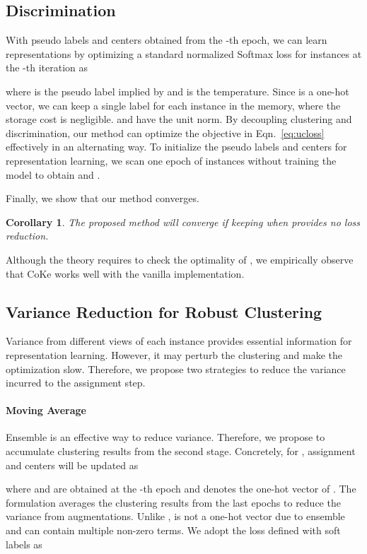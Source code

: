 \documentclass[10pt,twocolumn,letterpaper]{article}
\newtheorem{cor}{Corollary}
\begin{document}
\subsection{Discrimination}
With pseudo labels and centers obtained from the -th epoch, we can learn representations by optimizing a standard normalized Softmax loss for instances at the -th iteration as

where  is the pseudo label implied by  and  is the temperature. Since  is a one-hot vector, we can keep a single label for each instance in the memory, where the storage cost is negligible.  and  have the unit norm. By decoupling clustering and discrimination, our method can optimize the objective in Eqn.~\ref{eq:ucloss} effectively in an alternating way. To initialize the pseudo labels and centers for representation learning, we scan one epoch of instances without training the model to obtain  and .

Finally, we show that our method converges. 
\begin{cor}
The proposed method will converge if keeping  when  provides no loss reduction.
\end{cor}
Although the theory requires to check the optimality of , we empirically observe that CoKe works well with the vanilla implementation.

\subsection{Variance Reduction for Robust Clustering}

Variance from different views of each instance provides essential information for representation learning. However, it may perturb the clustering and make the optimization slow. Therefore, we propose two strategies to reduce the variance incurred to the assignment step.

\paragraph{Moving Average}
Ensemble is an effective way to reduce variance. Therefore, we propose to accumulate clustering results from the second stage. Concretely, for , assignment and centers will be updated as

where  and  are obtained at the -th epoch and  denotes the one-hot vector of . The formulation averages the clustering results from the last  epochs to reduce the variance from augmentations. Unlike ,  is not a one-hot vector due to ensemble and can contain multiple non-zero terms. We adopt the loss defined with soft labels as
\end{document}
